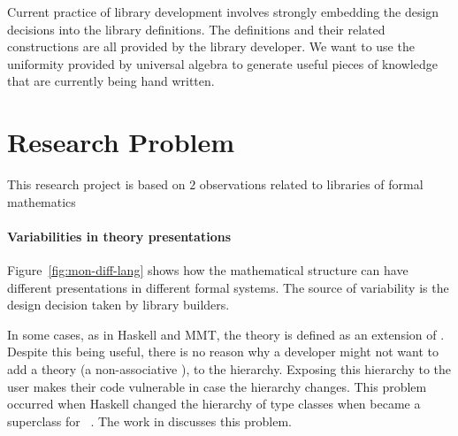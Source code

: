 
Current practice of library development involves strongly embedding the design decisions into the library definitions. The definitions and their related constructions are all provided by the library developer. We want to use the uniformity provided by universal algebra to generate useful pieces of knowledge that are currently being hand written. 

\section{Research Problem}

This research project is based on $2$ observations related to libraries of formal mathematics 

\paragraph{Variabilities in theory presentations}
Figure~\ref{fig:mon-diff-lang} shows how the mathematical structure  can have different presentations in different formal systems. The source of variability is the design decision taken by library builders. 

In some cases, as in Haskell and MMT, the theory \monoid is defined as an extension of \semigroup. Despite this being useful, there is no reason why a developer might not want to add a theory \unital (a non-associative \monoid), to the hierarchy. Exposing this hierarchy to the user makes their code vulnerable in case the hierarchy changes. This problem occurred when Haskell changed the hierarchy of type classes when  became a superclass for  ~\cite{wiki:haskell_hierarch}. The work in \cite{cohen2020hierarchy} discusses this problem. 

